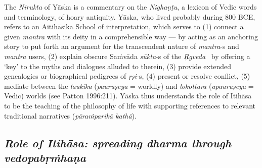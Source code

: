 The \textit{Nirukta} of Yāska is a commentary on the \textit{Nighaṇṭu}, a lexicon of Vedic words and terminology, of hoary antiquity. Yāska, who lived probably during 800 BCE, refers to an Aitihāsika School of interpretation, which serves to (1) connect a given \textit{mantra} with its deity in a comprehensible way — by acting as an anchoring story to put forth an argument for the transcendent nature of \textit{mantra}-s and \textit{mantra} users, (2) explain obscure Saṁvāda \textit{sūkta}-s of the \textit{Ṛgveda}  by offering a ‘key’ to the myths and dialogues alluded to therein, (3) provide extended genealogies or biographical pedigrees of \hbox{\textit{ṛṣi-}s}, (4) present or resolve conflict, (5) mediate between the \textit{laukika} (\textit{pauruṣeya} = worldly) and \textit{lokottara} (\textit{apauruṣeya} = Vedic) worlds (see Patton 1996:211). Yāska thus understands the role of Itihāsa to be the teaching of the philosophy of life with supporting references to relevant traditional narratives (\textit{pāraṁparikā kathā}).

\subsection*{\textit{Role of Itihāsa: spreading dharma through vedopabṛṁhaṇa}}

